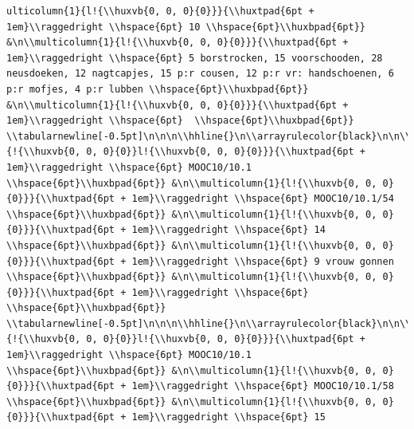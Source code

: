 \documentclass[11pt,preprint, authoryear]{elsarticle}
\numberwithin{equation}{section}
\numberwithin{figure}{section}
\numberwithin{table}{section}
\begin{document}
\begin{verbatim}
ulticolumn{1}{l!{\\huxvb{0, 0, 0}{0}}}{\\huxtpad{6pt + 1em}\\raggedright \\hspace{6pt} 10 \\hspace{6pt}\\huxbpad{6pt}} &\n\\multicolumn{1}{l!{\\huxvb{0, 0, 0}{0}}}{\\huxtpad{6pt + 1em}\\raggedright \\hspace{6pt} 5 borstrocken, 15 voorschooden, 28 neusdoeken, 12 nagtcapjes, 15 p:r cousen, 12 p:r vr: handschoenen, 6 p:r mofjes, 4 p:r lubben \\hspace{6pt}\\huxbpad{6pt}} &\n\\multicolumn{1}{l!{\\huxvb{0, 0, 0}{0}}}{\\huxtpad{6pt + 1em}\\raggedright \\hspace{6pt}  \\hspace{6pt}\\huxbpad{6pt}} \\tabularnewline[-0.5pt]\n\n\n\\hhline{}\n\\arrayrulecolor{black}\n\n\\multicolumn{1}{!{\\huxvb{0, 0, 0}{0}}l!{\\huxvb{0, 0, 0}{0}}}{\\huxtpad{6pt + 1em}\\raggedright \\hspace{6pt} MOOC10/10.1 \\hspace{6pt}\\huxbpad{6pt}} &\n\\multicolumn{1}{l!{\\huxvb{0, 0, 0}{0}}}{\\huxtpad{6pt + 1em}\\raggedright \\hspace{6pt} MOOC10/10.1/54 \\hspace{6pt}\\huxbpad{6pt}} &\n\\multicolumn{1}{l!{\\huxvb{0, 0, 0}{0}}}{\\huxtpad{6pt + 1em}\\raggedright \\hspace{6pt} 14 \\hspace{6pt}\\huxbpad{6pt}} &\n\\multicolumn{1}{l!{\\huxvb{0, 0, 0}{0}}}{\\huxtpad{6pt + 1em}\\raggedright \\hspace{6pt} 9 vrouw gonnen \\hspace{6pt}\\huxbpad{6pt}} &\n\\multicolumn{1}{l!{\\huxvb{0, 0, 0}{0}}}{\\huxtpad{6pt + 1em}\\raggedright \\hspace{6pt}  \\hspace{6pt}\\huxbpad{6pt}} \\tabularnewline[-0.5pt]\n\n\n\\hhline{}\n\\arrayrulecolor{black}\n\n\\multicolumn{1}{!{\\huxvb{0, 0, 0}{0}}l!{\\huxvb{0, 0, 0}{0}}}{\\huxtpad{6pt + 1em}\\raggedright \\hspace{6pt} MOOC10/10.1 \\hspace{6pt}\\huxbpad{6pt}} &\n\\multicolumn{1}{l!{\\huxvb{0, 0, 0}{0}}}{\\huxtpad{6pt + 1em}\\raggedright \\hspace{6pt} MOOC10/10.1/58 \\hspace{6pt}\\huxbpad{6pt}} &\n\\multicolumn{1}{l!{\\huxvb{0, 0, 0}{0}}}{\\huxtpad{6pt + 1em}\\raggedright \\hspace{6pt} 15
\end{verbatim}
\end{document}
